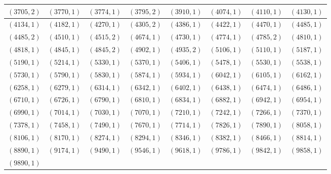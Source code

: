 \documentclass[11pt,reqno]{amsart}
\theoremstyle{definition}
\begin{document}
\begin{longtable}{|c|c|c|c|c|c|c|c|}
$ ( 3705 , 2 )$
 & 
$ ( 3770 , 1 )$
 & 
$ ( 3774 , 1 )$
 & 
$ ( 3795 , 2 )$
 & 
$ ( 3910 , 1 )$
 & 
$ ( 4074 , 1 )$
 & 
$ ( 4110 , 1 )$
 & 
$ ( 4130 , 1 )$
\\ \hline
$ ( 4134 , 1 )$
 & 
$ ( 4182 , 1 )$
 & 
$ ( 4270 , 1 )$
 & 
$ ( 4305 , 2 )$
 & 
$ ( 4386 , 1 )$
 & 
$ ( 4422 , 1 )$
 & 
$ ( 4470 , 1 )$
 & 
$ ( 4485 , 1 )$
\\ \hline
$ ( 4485 , 2 )$
 & 
$ ( 4510 , 1 )$
 & 
$ ( 4515 , 2 )$
 & 
$ ( 4674 , 1 )$
 & 
$ ( 4730 , 1 )$
 & 
$ ( 4774 , 1 )$
 & 
$ ( 4785 , 2 )$
 & 
$ ( 4810 , 1 )$
\\ \hline
$ ( 4818 , 1 )$
 & 
$ ( 4845 , 1 )$
 & 
$ ( 4845 , 2 )$
 & 
$ ( 4902 , 1 )$
 & 
$ ( 4935 , 2 )$
 & 
$ ( 5106 , 1 )$
 & 
$ ( 5110 , 1 )$
 & 
$ ( 5187 , 1 )$
\\ \hline
$ ( 5190 , 1 )$
 & 
$ ( 5214 , 1 )$
 & 
$ ( 5330 , 1 )$
 & 
$ ( 5370 , 1 )$
 & 
$ ( 5406 , 1 )$
 & 
$ ( 5478 , 1 )$
 & 
$ ( 5530 , 1 )$
 & 
$ ( 5538 , 1 )$
\\ \hline
$ ( 5730 , 1 )$
 & 
$ ( 5790 , 1 )$
 & 
$ ( 5830 , 1 )$
 & 
$ ( 5874 , 1 )$
 & 
$ ( 5934 , 1 )$
 & 
$ ( 6042 , 1 )$
 & 
$ ( 6105 , 1 )$
 & 
$ ( 6162 , 1 )$
\\ \hline
$ ( 6258 , 1 )$
 & 
$ ( 6279 , 1 )$
 & 
$ ( 6314 , 1 )$
 & 
$ ( 6342 , 1 )$
 & 
$ ( 6402 , 1 )$
 & 
$ ( 6438 , 1 )$
 & 
$ ( 6474 , 1 )$
 & 
$ ( 6486 , 1 )$
\\ \hline
$ ( 6710 , 1 )$
 & 
$ ( 6726 , 1 )$
 & 
$ ( 6790 , 1 )$
 & 
$ ( 6810 , 1 )$
 & 
$ ( 6834 , 1 )$
 & 
$ ( 6882 , 1 )$
 & 
$ ( 6942 , 1 )$
 & 
$ ( 6954 , 1 )$
\\ \hline
$ ( 6990 , 1 )$
 & 
$ ( 7014 , 1 )$
 & 
$ ( 7030 , 1 )$
 & 
$ ( 7070 , 1 )$
 & 
$ ( 7210 , 1 )$
 & 
$ ( 7242 , 1 )$
 & 
$ ( 7266 , 1 )$
 & 
$ ( 7370 , 1 )$
\\ \hline
$ ( 7378 , 1 )$
 & 
$ ( 7458 , 1 )$
 & 
$ ( 7490 , 1 )$
 & 
$ ( 7670 , 1 )$
 & 
$ ( 7714 , 1 )$
 & 
$ ( 7826 , 1 )$
 & 
$ ( 7890 , 1 )$
 & 
$ ( 8058 , 1 )$
\\ \hline
$ ( 8106 , 1 )$
 & 
$ ( 8170 , 1 )$
 & 
$ ( 8274 , 1 )$
 & 
$ ( 8294 , 1 )$
 & 
$ ( 8346 , 1 )$
 & 
$ ( 8382 , 1 )$
 & 
$ ( 8466 , 1 )$
 & 
$ ( 8814 , 1 )$
\\ \hline
$ ( 8890 , 1 )$
 & 
$ ( 9174 , 1 )$
 & 
$ ( 9490 , 1 )$
 & 
$ ( 9546 , 1 )$
 & 
$ ( 9618 , 1 )$
 & 
$ ( 9786 , 1 )$
 & 
$ ( 9842 , 1 )$
 & 
$ ( 9858 , 1 )$
\\ \hline
$ ( 9890 , 1 )$ & & & & & & & \\ \hline
\end{longtable}
\end{document}
